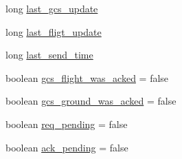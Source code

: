 \begin{DoxyCompactItemize}
\item 
long \hyperlink{classorg_1_1taulabs_1_1uavtalk_1_1_u_a_v_object_meta_data_adb3b540f639d528b47ef5d103c5efef6}{last\-\_\-gcs\-\_\-update}
\item 
long \hyperlink{classorg_1_1taulabs_1_1uavtalk_1_1_u_a_v_object_meta_data_a72ac9b0dab913947681cde2f2e8a02ca}{last\-\_\-fligt\-\_\-update}
\item 
long \hyperlink{classorg_1_1taulabs_1_1uavtalk_1_1_u_a_v_object_meta_data_aba089a420a184ae520b7d23e3ec8fc3c}{last\-\_\-send\-\_\-time}
\item 
boolean \hyperlink{classorg_1_1taulabs_1_1uavtalk_1_1_u_a_v_object_meta_data_a3c6385b04fa3f701efebcf18b671e674}{gcs\-\_\-flight\-\_\-was\-\_\-acked} = false
\item 
boolean \hyperlink{classorg_1_1taulabs_1_1uavtalk_1_1_u_a_v_object_meta_data_ac3511e7abda1c6d8375b2f675bbfdcb1}{gcs\-\_\-ground\-\_\-was\-\_\-acked} = false
\item 
boolean \hyperlink{classorg_1_1taulabs_1_1uavtalk_1_1_u_a_v_object_meta_data_af8d34a08114e87e9020242e200c61878}{req\-\_\-pending} = false
\item 
boolean \hyperlink{classorg_1_1taulabs_1_1uavtalk_1_1_u_a_v_object_meta_data_a377ab576f7d2fc1b07c600be6b01e053}{ack\-\_\-pending} = false
\end{DoxyCompactItemize}
